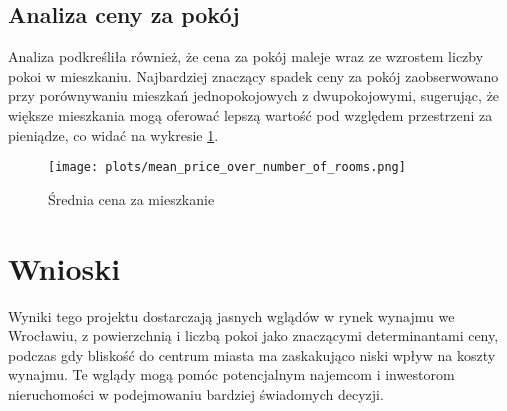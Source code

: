 \documentclass[12pt]{article}
\begin{document}
\subsection{Analiza ceny za pokój}
Analiza podkreśliła również, że cena za pokój maleje wraz ze wzrostem liczby pokoi w mieszkaniu. Najbardziej znaczący spadek ceny za pokój zaobserwowano przy porównywaniu mieszkań jednopokojowych z dwupokojowymi, sugerując, że większe mieszkania mogą oferować lepszą wartość pod względem przestrzeni za pieniądze, co widać na wykresie \ref{fig:mean_price_over_number_of_rooms}.

\begin{figure}[h]
  \centering
  \texttt{[image: plots/mean\_price\_over\_number\_of\_rooms.png]}
  \caption{Średnia cena za mieszkanie}
  \label{fig:mean_price_over_number_of_rooms}
\end{figure}

\section{Wnioski}
Wyniki tego projektu dostarczają jasnych wglądów w rynek wynajmu we Wrocławiu, z powierzchnią i liczbą pokoi jako znaczącymi determinantami ceny, podczas gdy bliskość do centrum miasta ma zaskakująco niski wpływ na koszty wynajmu. Te wglądy mogą pomóc potencjalnym najemcom i inwestorom nieruchomości w podejmowaniu bardziej świadomych decyzji.
\end{document}
